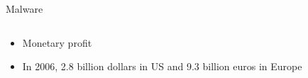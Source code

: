 \documentclass{beamer}
\begin{document}
\begin{frame}[h]{Malware}
\begin{columns}
\begin{column}{5cm}
\begin{figure}[t]
\begin{center}
      \end{center}
    \end{figure}
    \begin{itemize}
      \item Monetary profit
      \item In 2006, 2.8 billion dollars in US and 9.3 billion euros in Europe
    \end{itemize}
  \end{column}
\end{columns}
\end{frame}
\end{document}
